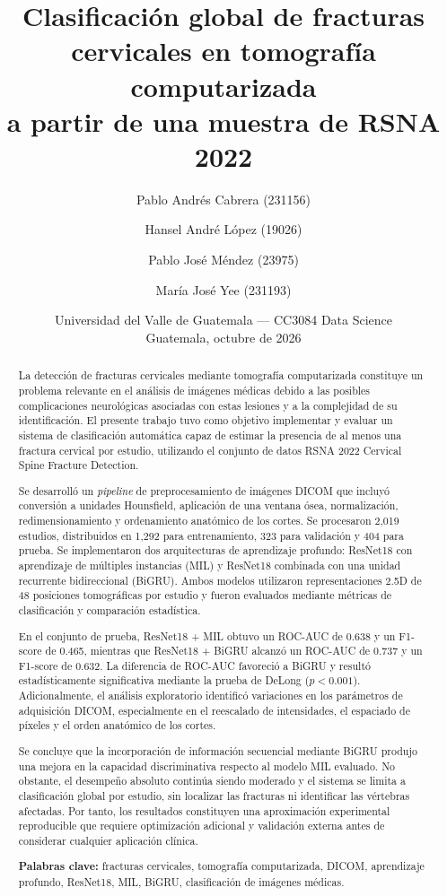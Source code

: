 \documentclass[11pt,a4paper]{article}
\title{Clasificación global de fracturas cervicales en tomografía computarizada\\
       a partir de una muestra de RSNA 2022}
\author{Pablo Andrés Cabrera (231156) \and Hansel André López (19026) \and Pablo José Méndez (23975) \and María José Yee (231193)}
\date{Universidad del Valle de Guatemala --- CC3084 Data Science\\Guatemala, octubre de 2026}
\begin{document}
\maketitle

\begin{abstract}

La detección de fracturas cervicales mediante tomografía computarizada constituye un problema relevante en el análisis de imágenes médicas debido a las posibles complicaciones neurológicas asociadas con estas lesiones y a la complejidad de su identificación. El presente trabajo tuvo como objetivo implementar y evaluar un sistema de clasificación automática capaz de estimar la presencia de al menos una fractura cervical por estudio, utilizando el conjunto de datos RSNA 2022 Cervical Spine Fracture Detection.

Se desarrolló un \textit{pipeline} de preprocesamiento de imágenes DICOM que incluyó conversión a unidades Hounsfield, aplicación de una ventana ósea, normalización, redimensionamiento y ordenamiento anatómico de los cortes. Se procesaron 2,019 estudios, distribuidos en 1,292 para entrenamiento, 323 para validación y 404 para prueba. Se implementaron dos arquitecturas de aprendizaje profundo: ResNet18 con aprendizaje de múltiples instancias (MIL) y ResNet18 combinada con una unidad recurrente bidireccional (BiGRU). Ambos modelos utilizaron representaciones 2.5D de 48 posiciones tomográficas por estudio y fueron evaluados mediante métricas de clasificación y comparación estadística.

En el conjunto de prueba, ResNet18 + MIL obtuvo un ROC-AUC de 0.638 y un F1-score de 0.465, mientras que ResNet18 + BiGRU alcanzó un ROC-AUC de 0.737 y un F1-score de 0.632. La diferencia de ROC-AUC favoreció a BiGRU y resultó estadísticamente significativa mediante la prueba de DeLong ($p < 0.001$). Adicionalmente, el análisis exploratorio identificó variaciones en los parámetros de adquisición DICOM, especialmente en el reescalado de intensidades, el espaciado de píxeles y el orden anatómico de los cortes.

Se concluye que la incorporación de información secuencial mediante BiGRU produjo una mejora en la capacidad discriminativa respecto al modelo MIL evaluado. No obstante, el desempeño absoluto continúa siendo moderado y el sistema se limita a clasificación global por estudio, sin localizar las fracturas ni identificar las vértebras afectadas. Por tanto, los resultados constituyen una aproximación experimental reproducible que requiere optimización adicional y validación externa antes de considerar cualquier aplicación clínica.

\medskip
\noindent\textbf{Palabras clave:} fracturas cervicales, tomografía computarizada, DICOM, aprendizaje profundo, ResNet18, MIL, BiGRU, clasificación de imágenes médicas.

\end{abstract}
\end{document}
